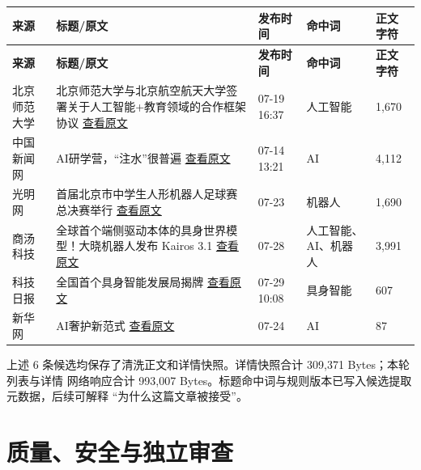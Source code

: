 \documentclass[UTF8,11pt,a4paper,fontset=none]{ctexart}
\begin{document}
\begin{longtable}{L{2.75cm}L{6.25cm}L{2.2cm}L{2.15cm}L{1.75cm}}
\toprule
{}
\color{white}\bfseries 来源 & \color{white}\bfseries 标题/原文 &
\color{white}\bfseries 发布时间 & \color{white}\bfseries 命中词 &
\color{white}\bfseries 正文字符 \\
\midrule
\endfirsthead
\toprule
{}
\color{white}\bfseries 来源 & \color{white}\bfseries 标题/原文 &
\color{white}\bfseries 发布时间 & \color{white}\bfseries 命中词 &
\color{white}\bfseries 正文字符 \\
\midrule
\endhead
北京师范大学 & 北京师范大学与北京航空航天大学签署关于人工智能+教育领域的合作框架协议
\newline\href{https://news.bnu.edu.cn/zx/ttgz/293edc4b328449368e6da0fc704432d8.htm}{查看原文} &
07-19 16:37 & 人工智能 & 1,670 \\
中国新闻网 & AI研学营，“注水”很普遍
\newline\href{https://www.chinanews.com.cn/edu/2026/07-14/10658982.shtml}{查看原文} &
07-14 13:21 & AI & 4,112 \\
光明网 & 首届北京市中学生人形机器人足球赛总决赛举行
\newline\href{https://edu.gmw.cn/2026-07/23/content_38903218.htm}{查看原文} &
07-23 & 机器人 & 1,690 \\
商汤科技 & 全球首个端侧驱动本体的具身世界模型！大晓机器人发布 Kairos 3.1
\newline\href{https://www.sensetime.com/cn/news/51170767}{查看原文} &
07-28 & 人工智能、AI、机器人 & 3,991 \\
科技日报 & 全国首个具身智能发展局揭牌
\newline\href{https://www.stdaily.com/web/gdxw/2026-07/29/content_555090.html}{查看原文} &
07-29 10:08 & 具身智能 & 607 \\
新华网 & AI奢护新范式
\newline\href{https://www.news.cn/tech/20260724/4162865b956b492f9f7b3ac15d1e8626/c.html}{查看原文} &
07-24 & AI & 87 \\
\bottomrule
\end{longtable}

上述 6 条候选均保存了清洗正文和详情快照。详情快照合计 309,371 Bytes；本轮列表与详情
网络响应合计 993,007 Bytes。标题命中词与规则版本已写入候选提取元数据，后续可解释
“为什么这篇文章被接受”。

\section{质量、安全与独立审查}
\end{document}
